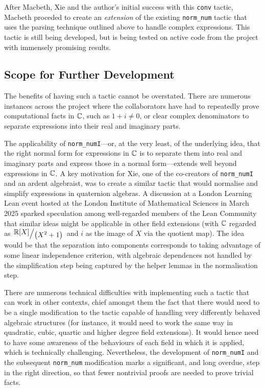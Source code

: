 After Macbeth, Xie and the author's initial success with this \lstinline|conv| tactic, Macbeth proceded to create an \textit{extension} of the existing \lstinline|norm_num| tactic that uses the parsing technique outlined above to handle complex expressions. This tactic is still being developed, but is being tested on active code from the project with immensely promising results.

\subsection{Scope for Further Development}

The benefits of having such a tactic cannot be overstated. There are numerous instances across the project where the collaborators have had to repeatedly prove computational facts in $\mathbb{C}$, such as $1 + i \neq 0$, or clear complex denominators to separate expressions into their real and imaginary parts.


The applicability of \lstinline|norm_numI|---or, at the very least, of the underlying idea, that the right normal form for expressions in $\mathbb{C}$ is to separate them into real and imaginary parts and express those in a normal form---extends well beyond expressions in $\mathbb{C}$. A key motivation for Xie, one of the co-creators of \lstinline|norm_numI| and an ardent algebraist, was to create a similar tactic that would normalise and simplify expressions in quaternion algebras. A discussion at a London Learning Lean event hosted at the London Institute of Mathematical Sciences in March 2025 sparked speculation among well-regarded members of the Lean Community that similar ideas might be applicable in other field extensions (with $\mathbb{C}$ regarded as $\quotient{\R[X]}{\parenth{X^2 + 1}}$ and $i$ as the image of $X$ via the quotient map). The idea would be that the separation into components corresponds to taking advantage of some linear independence criterion, with algebraic dependences not handled by the simplification step being captured by the helper lemmas in the normalisation step.

There are numerous technical difficulties with implementing such a tactic that can work in other contexts, chief amongst them the fact that there would need to be a single modification to the tactic capable of handling very differently behaved algebraic structures (for instance, it would need to work the same way in quadratic, cubic, quartic and higher degree field extensions). It would hence need to have some awareness of the behaviours of each field in which it is applied, which is technically challenging. Nevertheless, the development of \lstinline|norm_numI| and the subsequent \lstinline|norm_num| modification marks a significant, and long overdue, step in the right direction, so that fewer nontrivial proofs are needed to prove trivial facts.